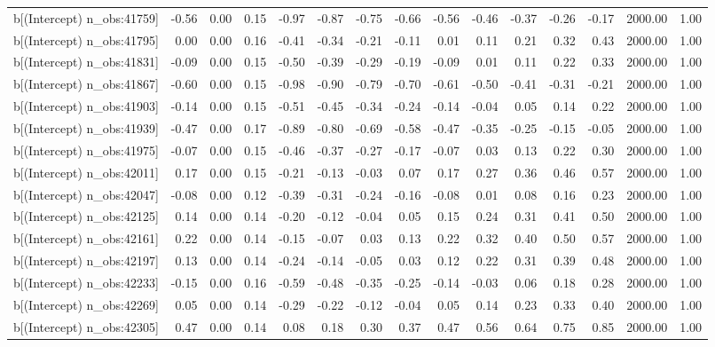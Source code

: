 \begin{table}[ht]
\begin{tabular}{rrrrrrrrrrrrrrr}
  b[(Intercept) n\_obs:41759] & -0.56 & 0.00 & 0.15 & -0.97 & -0.87 & -0.75 & -0.66 & -0.56 & -0.46 & -0.37 & -0.26 & -0.17 & 2000.00 & 1.00 \\ 
  b[(Intercept) n\_obs:41795] & 0.00 & 0.00 & 0.16 & -0.41 & -0.34 & -0.21 & -0.11 & 0.01 & 0.11 & 0.21 & 0.32 & 0.43 & 2000.00 & 1.00 \\ 
  b[(Intercept) n\_obs:41831] & -0.09 & 0.00 & 0.15 & -0.50 & -0.39 & -0.29 & -0.19 & -0.09 & 0.01 & 0.11 & 0.22 & 0.33 & 2000.00 & 1.00 \\ 
  b[(Intercept) n\_obs:41867] & -0.60 & 0.00 & 0.15 & -0.98 & -0.90 & -0.79 & -0.70 & -0.61 & -0.50 & -0.41 & -0.31 & -0.21 & 2000.00 & 1.00 \\ 
  b[(Intercept) n\_obs:41903] & -0.14 & 0.00 & 0.15 & -0.51 & -0.45 & -0.34 & -0.24 & -0.14 & -0.04 & 0.05 & 0.14 & 0.22 & 2000.00 & 1.00 \\ 
  b[(Intercept) n\_obs:41939] & -0.47 & 0.00 & 0.17 & -0.89 & -0.80 & -0.69 & -0.58 & -0.47 & -0.35 & -0.25 & -0.15 & -0.05 & 2000.00 & 1.00 \\ 
  b[(Intercept) n\_obs:41975] & -0.07 & 0.00 & 0.15 & -0.46 & -0.37 & -0.27 & -0.17 & -0.07 & 0.03 & 0.13 & 0.22 & 0.30 & 2000.00 & 1.00 \\ 
  b[(Intercept) n\_obs:42011] & 0.17 & 0.00 & 0.15 & -0.21 & -0.13 & -0.03 & 0.07 & 0.17 & 0.27 & 0.36 & 0.46 & 0.57 & 2000.00 & 1.00 \\ 
  b[(Intercept) n\_obs:42047] & -0.08 & 0.00 & 0.12 & -0.39 & -0.31 & -0.24 & -0.16 & -0.08 & 0.01 & 0.08 & 0.16 & 0.23 & 2000.00 & 1.00 \\ 
  b[(Intercept) n\_obs:42125] & 0.14 & 0.00 & 0.14 & -0.20 & -0.12 & -0.04 & 0.05 & 0.15 & 0.24 & 0.31 & 0.41 & 0.50 & 2000.00 & 1.00 \\ 
  b[(Intercept) n\_obs:42161] & 0.22 & 0.00 & 0.14 & -0.15 & -0.07 & 0.03 & 0.13 & 0.22 & 0.32 & 0.40 & 0.50 & 0.57 & 2000.00 & 1.00 \\ 
  b[(Intercept) n\_obs:42197] & 0.13 & 0.00 & 0.14 & -0.24 & -0.14 & -0.05 & 0.03 & 0.12 & 0.22 & 0.31 & 0.39 & 0.48 & 2000.00 & 1.00 \\ 
  b[(Intercept) n\_obs:42233] & -0.15 & 0.00 & 0.16 & -0.59 & -0.48 & -0.35 & -0.25 & -0.14 & -0.03 & 0.06 & 0.18 & 0.28 & 2000.00 & 1.00 \\ 
  b[(Intercept) n\_obs:42269] & 0.05 & 0.00 & 0.14 & -0.29 & -0.22 & -0.12 & -0.04 & 0.05 & 0.14 & 0.23 & 0.33 & 0.40 & 2000.00 & 1.00 \\ 
  b[(Intercept) n\_obs:42305] & 0.47 & 0.00 & 0.14 & 0.08 & 0.18 & 0.30 & 0.37 & 0.47 & 0.56 & 0.64 & 0.75 & 0.85 & 2000.00 & 1.00 \\ 

\end{tabular}
\end{table}
